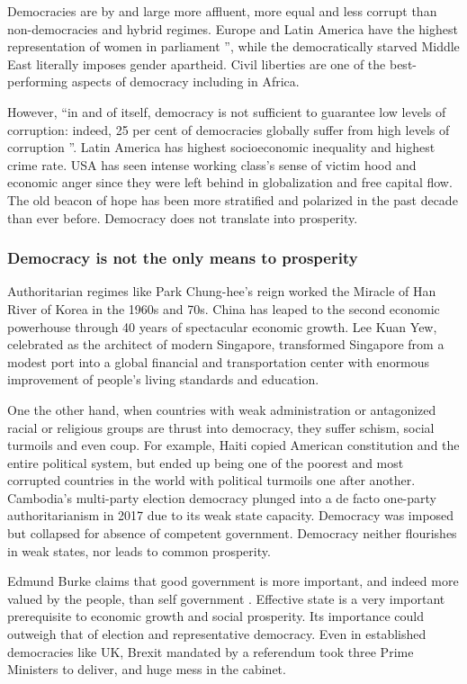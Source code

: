 \documentclass{scrartcl}
\begin{document}
Democracies are by and large more affluent, more equal and less corrupt
than non-democracies and hybrid regimes. Europe and Latin America
have the highest representation of women in parliament ''\autocite[6]{IDEA},
while the democratically starved Middle East literally imposes gender
apartheid. Civil liberties are one of the best-performing aspects
of democracy including in Africa. 

However, ``in and of itself, democracy is not sufficient to guarantee
low levels of corruption: indeed, 25 per cent of democracies globally
suffer from high levels of corruption ''\autocite[3]{IDEA}. Latin
America has highest socioeconomic inequality and highest crime rate.
USA has seen intense working class's sense of victim hood and economic
anger since they were left behind in globalization and free capital
flow. The old beacon of hope has been more stratified and polarized
in the past decade than ever before. Democracy does not translate
into prosperity. 

\subsubsection*{Democracy is not the only means to prosperity}

Authoritarian regimes like Park Chung-hee's reign worked the Miracle
of Han River of Korea in the 1960s and 70s. China has leaped to the
second economic powerhouse through 40 years of spectacular economic
growth. Lee Kuan Yew, celebrated as the architect of modern Singapore,
transformed Singapore from a modest port into a global financial and
transportation center with enormous improvement of people's living
standards and education. 

One the other hand, when countries with weak administration or antagonized
racial or religious groups are thrust into democracy, they suffer
schism, social turmoils and even coup. For example, Haiti copied American
constitution and the entire political system, but ended up being one
of the poorest and most corrupted countries in the world with political
turmoils one after another. Cambodia’s multi-party election democracy
plunged into a de facto one-party authoritarianism in 2017 due to
its weak state capacity. Democracy was imposed but collapsed for absence
of competent government. Democracy neither flourishes in weak states,
nor leads to common prosperity. 

Edmund Burke claims that good government is more important, and indeed
more valued by the people, than self government \autocite[70]{scand}.
Effective state is a very important prerequisite to economic growth
and social prosperity. Its importance could outweigh that of election
and representative democracy. 
Even in established democracies like UK,
Brexit mandated by a referendum took three Prime Ministers to deliver,
and huge mess in the cabinet.
\end{document}
